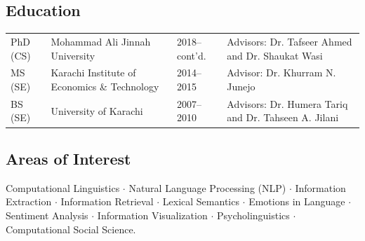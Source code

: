 \documentclass[a4paper, 10pt]{article}
\begin{document}

\subsection*{\textcolor{NavyBlue}{Education}}
{
\tabcolsep=3pt
\begin{tabular}{llll}
PhD (CS) & Mohammad Ali Jinnah University & 2018--cont'd. & Advisors: Dr. Tafseer Ahmed and Dr. Shaukat Wasi\\
MS (SE) & Karachi Institute of Economics \& Technology & 2014--2015 & Advisor: Dr. Khurram N. Junejo\\
BS (SE) & University of Karachi & 2007--2010 & Advisors: Dr. Humera Tariq and Dr. Tahseen A. Jilani\\
\end{tabular}
}

\subsection*{\textcolor{NavyBlue}{Areas of Interest}}
Computational Linguistics $\cdot$ Natural Language Processing (NLP) $\cdot$ Information Extraction $\cdot$ Information Retrieval $\cdot$ Lexical Semantics $\cdot$ Emotions in Language $\cdot$ Sentiment Analysis $\cdot$ Information Visualization $\cdot$ Psycholinguistics $\cdot$ Computational Social Science.
\end{document}

